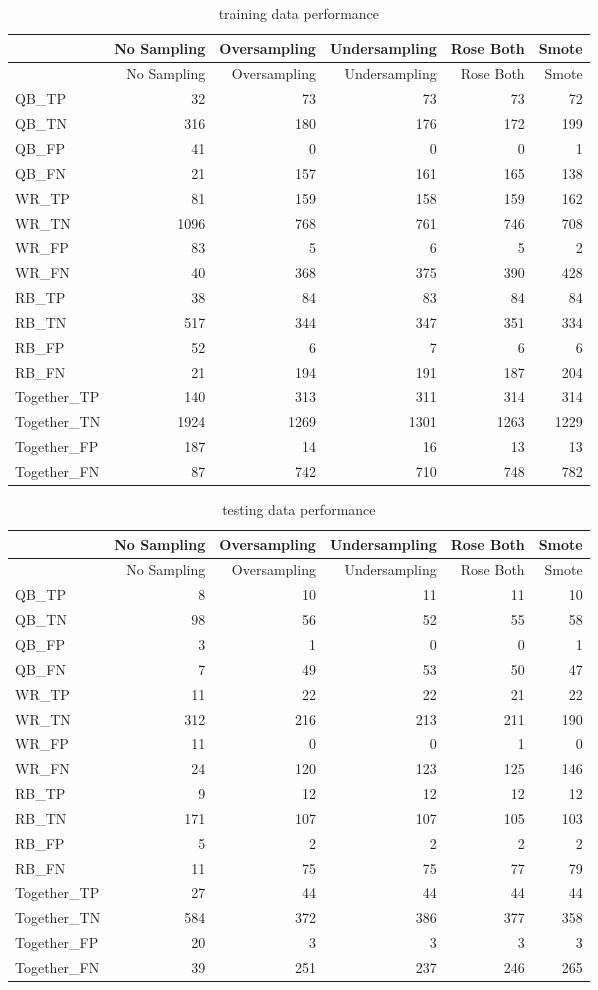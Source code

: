 \documentclass[]{article}
\begin{document}
\begin{longtable}[]{@{}lrrrrr@{}}
\caption{training data performance}\tabularnewline
\toprule
& No Sampling & Oversampling & Undersampling & Rose Both &
Smote\tabularnewline
\midrule
\endfirsthead
\toprule
& No Sampling & Oversampling & Undersampling & Rose Both &
Smote\tabularnewline
\midrule
\endhead
QB\_TP & 32 & 73 & 73 & 73 & 72\tabularnewline
QB\_TN & 316 & 180 & 176 & 172 & 199\tabularnewline
QB\_FP & 41 & 0 & 0 & 0 & 1\tabularnewline
QB\_FN & 21 & 157 & 161 & 165 & 138\tabularnewline
WR\_TP & 81 & 159 & 158 & 159 & 162\tabularnewline
WR\_TN & 1096 & 768 & 761 & 746 & 708\tabularnewline
WR\_FP & 83 & 5 & 6 & 5 & 2\tabularnewline
WR\_FN & 40 & 368 & 375 & 390 & 428\tabularnewline
RB\_TP & 38 & 84 & 83 & 84 & 84\tabularnewline
RB\_TN & 517 & 344 & 347 & 351 & 334\tabularnewline
RB\_FP & 52 & 6 & 7 & 6 & 6\tabularnewline
RB\_FN & 21 & 194 & 191 & 187 & 204\tabularnewline
Together\_TP & 140 & 313 & 311 & 314 & 314\tabularnewline
Together\_TN & 1924 & 1269 & 1301 & 1263 & 1229\tabularnewline
Together\_FP & 187 & 14 & 16 & 13 & 13\tabularnewline
Together\_FN & 87 & 742 & 710 & 748 & 782\tabularnewline
\bottomrule
\end{longtable}

\begin{longtable}[]{@{}lrrrrr@{}}
\caption{testing data performance}\tabularnewline
\toprule
& No Sampling & Oversampling & Undersampling & Rose Both &
Smote\tabularnewline
\midrule
\endfirsthead
\toprule
& No Sampling & Oversampling & Undersampling & Rose Both &
Smote\tabularnewline
\midrule
\endhead
QB\_TP & 8 & 10 & 11 & 11 & 10\tabularnewline
QB\_TN & 98 & 56 & 52 & 55 & 58\tabularnewline
QB\_FP & 3 & 1 & 0 & 0 & 1\tabularnewline
QB\_FN & 7 & 49 & 53 & 50 & 47\tabularnewline
WR\_TP & 11 & 22 & 22 & 21 & 22\tabularnewline
WR\_TN & 312 & 216 & 213 & 211 & 190\tabularnewline
WR\_FP & 11 & 0 & 0 & 1 & 0\tabularnewline
WR\_FN & 24 & 120 & 123 & 125 & 146\tabularnewline
RB\_TP & 9 & 12 & 12 & 12 & 12\tabularnewline
RB\_TN & 171 & 107 & 107 & 105 & 103\tabularnewline
RB\_FP & 5 & 2 & 2 & 2 & 2\tabularnewline
RB\_FN & 11 & 75 & 75 & 77 & 79\tabularnewline
Together\_TP & 27 & 44 & 44 & 44 & 44\tabularnewline
Together\_TN & 584 & 372 & 386 & 377 & 358\tabularnewline
Together\_FP & 20 & 3 & 3 & 3 & 3\tabularnewline
Together\_FN & 39 & 251 & 237 & 246 & 265\tabularnewline
\bottomrule
\end{longtable}
\end{document}
